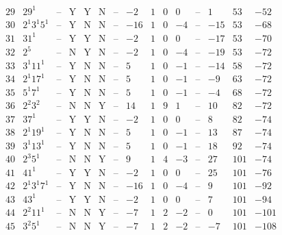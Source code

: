 \documentclass[11pt,reqno,a4letter]{article}
\numberwithin{figure}{section}
\numberwithin{table}{section}
\theoremstyle{plain}
\numberwithin{theorem}{section}
\theoremstyle{definition}
\begin{document}
\begin{table}[h!]
\begin{equation*}
{\begin{array}{|cc|c|ccc|c|c|ccc|c|ccc}
 29 & 29^1 & \text{--} & \text{Y} & \text{Y} & \text{N} & \text{--} & -2 & 1 & 0 & 0 & \text{--} & 1 & 53 & -52 \\
 30 & 2^1 3^1 5^1 & \text{--} & \text{Y} & \text{N} & \text{N} & \text{--} & -16 & 1 & 0 & -4 & \text{--} & -15 & 53 & -68 \\
 31 & 31^1 & \text{--} & \text{Y} & \text{Y} & \text{N} & \text{--} & -2 & 1 & 0 & 0 & \text{--} & -17 & 53 & -70 \\
 32 & 2^5 & \text{--} & \text{N} & \text{Y} & \text{N} & \text{--} & -2 & 1 & 0 & -4 & \text{--} & -19 & 53 & -72 \\
 33 & 3^1 11^1 & \text{--} & \text{Y} & \text{N} & \text{N} & \text{--} & 5 & 1 & 0 & -1 & \text{--} & -14 & 58 & -72 \\
 34 & 2^1 17^1 & \text{--} & \text{Y} & \text{N} & \text{N} & \text{--} & 5 & 1 & 0 & -1 & \text{--} & -9 & 63 & -72 \\
 35 & 5^1 7^1 & \text{--} & \text{Y} & \text{N} & \text{N} & \text{--} & 5 & 1 & 0 & -1 & \text{--} & -4 & 68 & -72 \\
 36 & 2^2 3^2 & \text{--} & \text{N} & \text{N} & \text{Y} & \text{--} & 14 & 1 & 9 & 1 & \text{--} & 10 & 82 & -72 \\
 37 & 37^1 & \text{--} & \text{Y} & \text{Y} & \text{N} & \text{--} & -2 & 1 & 0 & 0 & \text{--} & 8 & 82 & -74 \\
 38 & 2^1 19^1 & \text{--} & \text{Y} & \text{N} & \text{N} & \text{--} & 5 & 1 & 0 & -1 & \text{--} & 13 & 87 & -74 \\
 39 & 3^1 13^1 & \text{--} & \text{Y} & \text{N} & \text{N} & \text{--} & 5 & 1 & 0 & -1 & \text{--} & 18 & 92 & -74 \\
 40 & 2^3 5^1 & \text{--} & \text{N} & \text{N} & \text{Y} & \text{--} & 9 & 1 & 4 & -3 & \text{--} & 27 & 101 & -74 \\
 41 & 41^1 & \text{--} & \text{Y} & \text{Y} & \text{N} & \text{--} & -2 & 1 & 0 & 0 & \text{--} & 25 & 101 & -76 \\
 42 & 2^1 3^1 7^1 & \text{--} & \text{Y} & \text{N} & \text{N} & \text{--} & -16 & 1 & 0 & -4 & \text{--} & 9 & 101 & -92 \\
 43 & 43^1 & \text{--} & \text{Y} & \text{Y} & \text{N} & \text{--} & -2 & 1 & 0 & 0 & \text{--} & 7 & 101 & -94 \\
 44 & 2^2 11^1 & \text{--} & \text{N} & \text{N} & \text{Y} & \text{--} & -7 & 1 & 2 & -2 & \text{--} & 0 & 101 & -101 \\
 45 & 3^2 5^1 & \text{--} & \text{N} & \text{N} & \text{Y} & \text{--} & -7 & 1 & 2 & -2 & \text{--} & -7 & 101 & -108 \\

\end{array}}
\end{equation*}
\end{table}
\end{document}
